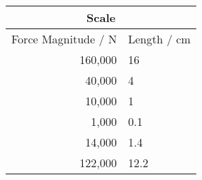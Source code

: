 \documentclass[12pt]{article}
\begin{document}
\vspace{1cm}
\hspace{1cm}\begin{tabular}{@{}r@{\ \ :\ \ }l@{}} 
\multicolumn{2}{c}{Scale} \\ \toprule
Force Magnitude / N & Length / cm \\ \midrule
160,000 & 16\phantom{.0} \\
 40,000 & \phantom{0}4\phantom{.0} \\
 10,000 & \phantom{0}1\phantom{.0} \\
  1,000 & \phantom{0}0.1 \\
 14,000 & \phantom{0}1.4 \\
122,000 & 12.2 \\
\bottomrule
\end{tabular}

\end{document}
